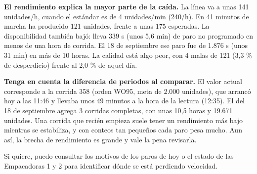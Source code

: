 \begin{singlespace}
{\textbf{El rendimiento explica la mayor parte de la caída.} La línea va a unas 141 unidades/h, cuando el estándar es de 4 unidades/min (240/h). En 41 minutos de marcha ha producido 121 unidades, frente a unas 175 esperadas. La disponibilidad también bajó: lleva 339 s (unos 5,6 min) de paro no programado en menos de una hora de corrida. El 18 de septiembre ese paro fue de 1.876 s (unos 31 min) en más de 10 horas. La calidad está algo peor, con 4 malas de 121 (3,3 \% de desperdicio) frente al 2,0 \% de aquel día.



\textbf{Tenga en cuenta la diferencia de periodos al comparar.} El valor actual corresponde a la corrida 358 (orden WO95, meta de 2.000 unidades), que arrancó hoy a las 11:46 y llevaba unos 49 minutos a la hora de la lectura (12:35). El del 18 de septiembre agrega 3 corridas completas, con unas 10,5 horas y 19.671 unidades. Una corrida que recién empieza suele tener un rendimiento más bajo mientras se estabiliza, y con conteos tan pequeños cada paro pesa mucho. Aun así, la brecha de rendimiento es grande y vale la pena revisarla.



Si quiere, puedo consultar los motivos de los paros de hoy o el estado de las Empacadoras 1 y 2 para identificar dónde se está perdiendo velocidad.}

\end{singlespace}
